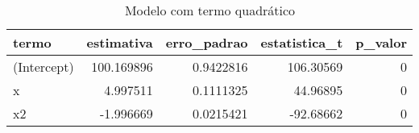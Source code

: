 \begin{table}

\caption{\label{tab:tabela2_exemplo4}Modelo com termo quadrático}
\centering
\begin{tabular}[t]{l|r|r|r|r}
\hline
termo & estimativa & erro\_padrao & estatistica\_t & p\_valor\\
\hline
(Intercept) & 100.169896 & 0.9422816 & 106.30569 & 0\\
\hline
x & 4.997511 & 0.1111325 & 44.96895 & 0\\
\hline
x2 & -1.996669 & 0.0215421 & -92.68662 & 0\\
\hline
\end{tabular}
\end{table}

